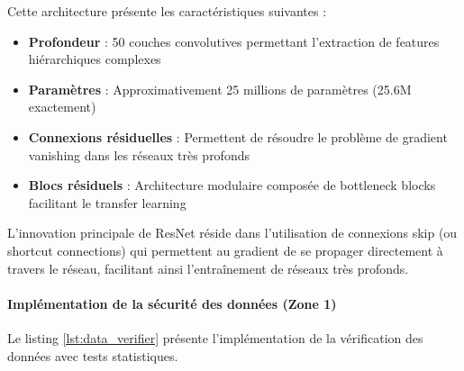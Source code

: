 Cette architecture présente les caractéristiques suivantes :
\begin{itemize}
    \item \textbf{Profondeur} : 50 couches convolutives permettant l'extraction de features hiérarchiques complexes
    \item \textbf{Paramètres} : Approximativement 25 millions de paramètres (25.6M exactement)
    \item \textbf{Connexions résiduelles} : Permettent de résoudre le problème de gradient vanishing dans les réseaux très profonds
    \item \textbf{Blocs résiduels} : Architecture modulaire composée de bottleneck blocks facilitant le transfer learning
\end{itemize}

L'innovation principale de ResNet réside dans l'utilisation de connexions skip (ou shortcut connections) qui permettent au gradient de se propager directement à travers le réseau, facilitant ainsi l'entraînement de réseaux très profonds.

\paragraph{Implémentation de la sécurité des données (Zone 1)}

Le listing \ref{lst:data_verifier} présente l'implémentation de la vérification des données avec tests statistiques.

